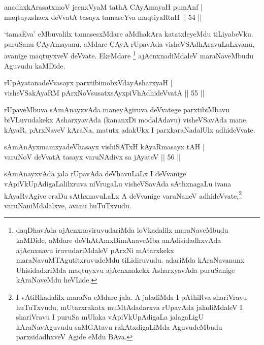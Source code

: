 \begin{shl}
anadhxkArasatxmoV jecnxVyaM tathA CAyAmayaH pumAnf |\\
maqtuyxshacx deVvatA tasayx tamaseYva maqtiyaRtaH \hfill || 54 ||
\end{shl}

\begin{artha}%
`tamaEva' eMbuvalilx tamasesxMdare aMdhakAra katatxleyeMdu tiLiyabeVku. puruSanu CAyAmayanu. aMdare CAyA rUpavAda visheVSAdhAravuLaLxvanu, avanige maqtuyxveV deVvate. EkeMdare \footnote[1]{daqDhavAda ajAcnxnaviruvudariMda loVkadalilx maraNaveMbudu kaMDide, aMdare deVhAtAmxBimAnaveMba anAdisidadhxvAda ajAcnxnavu iruvudariMdaleV pArxNi mAtarxkekx maraNavuMTAgutitxruvudeMdu tiLidiruvudu. adariMda kAraNavanunx UhisidadxriMda maqtuyxvu ajAcnxnakekx AsharxyavAda puruSanige kAraNaveMdu heVLide.} ajAcnxnadiMdaleV maraNaveMbudu Aguvudu kaMDide.
\end{artha}


\begin{shl}
rUpAyatanadeVvasayx parxtibimobxVdayAsharxyaH |\\
visheVSakAyaRM pArxNoV\s susatxsAyxpiVhAdhideVvatA \hfill || 55 ||
\end{shl}

\begin{artha}
rUpaveMbuva sAmAnayxvAda maneyAgiruva deVvatege parxtibiMbavu biVLuvudakekx AsharxyavAda (kananxDi modalAdavu) visheVSavAda mane, kAyaR, pArxNaveV kAraNa, matutx adakUkx I parxkaraNadalUlx adhideVvate.
\end{artha}


\begin{shl}
sAmAnAyxmamxyadeVhasayx vishiSATxH kAyaRmasayx tAH |\\
varuNoV deVvatA tasayx varuNAdivx sa jAyateV \hfill || 56 ||
\end{shl}

\begin{artha}
sAmAnayxvAda jala rUpavAda deVhavuLaLx I deVvanige vApiVkUpAdigaLalilxruva  niVrugaLu visheVSavAda sAthxnagaLu ivana kAyaRvAgive eraDu sAthxnavuLaLx A deVvanige varuNaneV adhideVvate,\footnote[2]{I vAtiRkadalilx maraNa eMdare jala. A jaladiMda I pAthiRva shariVravu huTuTxvudu, mUtarxrakatx muMtAdadarxva rUpavAda jaladiMdaleV I shariVravu I puruSa mUlaka vApiVkUpAdigaLa jalagaLigU kAraNavAguvudu saMGAtavu rakAtxdigaLiMda AguvudeMbudu parxsidadhxveV Agide eMdu BAva.} varuNaniMdalalxve, avanu huTuTxvudu.
\end{artha}


